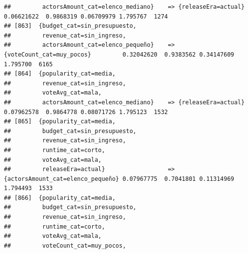 \documentclass[
]{article}
\begin{document}
\begin{verbatim}
##         actorsAmount_cat=elenco_mediano}    => {releaseEra=actual}               0.06621622  0.9868319 0.06709979 1.795767  1274
## [863]  {budget_cat=sin_presupuesto,                                                                                             
##         revenue_cat=sin_ingreso,                                                                                                
##         actorsAmount_cat=elenco_pequeño}    => {voteCount_cat=muy_pocos}         0.32042620  0.9383562 0.34147609 1.795700  6165
## [864]  {popularity_cat=media,                                                                                                   
##         revenue_cat=sin_ingreso,                                                                                                
##         voteAvg_cat=mala,                                                                                                       
##         actorsAmount_cat=elenco_mediano}    => {releaseEra=actual}               0.07962578  0.9864778 0.08071726 1.795123  1532
## [865]  {popularity_cat=media,                                                                                                   
##         budget_cat=sin_presupuesto,                                                                                             
##         revenue_cat=sin_ingreso,                                                                                                
##         runtime_cat=corto,                                                                                                      
##         voteAvg_cat=mala,                                                                                                       
##         releaseEra=actual}                  => {actorsAmount_cat=elenco_pequeño} 0.07967775  0.7041801 0.11314969 1.794493  1533
## [866]  {popularity_cat=media,                                                                                                   
##         budget_cat=sin_presupuesto,                                                                                             
##         revenue_cat=sin_ingreso,                                                                                                
##         runtime_cat=corto,                                                                                                      
##         voteAvg_cat=mala,                                                                                                       
##         voteCount_cat=muy_pocos,                                                                                                

\end{verbatim}
\end{document}
